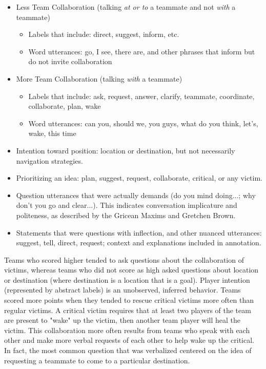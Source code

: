 \begin{itemize}
    \item Less Team Collaboration (talking \emph{at or to} a teammate and not \emph{with} a teammate)
    \begin{itemize}
    	\item Labels that include: direct, suggest, inform, etc.
	\item Word utterances: go, I see, there are, and other phrases that inform but do not invite collaboration
    \end{itemize}
    \item More Team Collaboration (talking \emph{with} a teammate)
    \begin{itemize}
        \item Labels that include: ask, request, answer, clarify, teammate, coordinate, collaborate, plan, wake
        \item Word utterances: can you, should we, you guys, what do you think, let's, wake, this time
    \end{itemize}
    \item Intention toward position: location or destination, but not necessarily navigation strategies.
    \item Prioritizing an idea: plan, suggest, request, collaborate, critical, or any victim.
    \item Question utterances that were actually demands (do you mind doing...; why don't you go and clear...). This indicates conversation implicature and politeness, as described by the Gricean Maxims and Gretchen Brown.
    \item Statements that were questions with inflection, and other nuanced utterances: suggest, tell, direct, request; context and explanations included in annotation.
\end{itemize}



Teams who scored higher tended to ask questions about the collaboration of victims, whereas teams who did not score as high asked questions about location or destination (where destination is a location that is a goal). Player intention (represented by abstract labels) is an unobserved, inferred behavior. Teams scored more points when they tended to rescue critical victims more often than regular victims. A critical victim requires that at least two players of the team are present to "wake" up the victim, then another team player will heal the victim. This collaboration more often results from teams who speak with each other and make more verbal requests of each other to help wake up the critical. In fact, the most common question that was verbalized centered on the idea of requesting a teammate to come to a particular destination.

